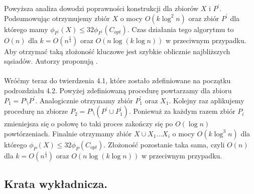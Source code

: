 \noindent
Powyższa analiza dowodzi poprawności konstrukcji dla zbiorów $X$ i $P^{'}$.
Podsumowując otrzymujemy zbiór $X$ o mocy $O(k \log^{2} n)$ oraz zbiór $P^{'}$ dla którego mamy $\phi_{P^{'}}(X) \leq 32\phi_{P^{'}}(C_{opt})$.
Czas działania tego algorytmu to $O(n)$ dla $k = O(n^{\frac{1}{4}})$ oraz $O(n \log (k \log n))$ w przeciwnym przypadku.
Aby otrzymać taką złożoność kluczowe jest szybkie oblicznie najbliższych sąsiadów.
Autorzy proponują \cite{10.1145/293347.293348}.
\\~\\
Wróćmy teraz do twierdzenia 4.1, które zostało zdefiniowane na początku podrozdziału 4.2.
Powyżej zdefiniowaną procedurę powtarzamy dla zbioru $P_{1} = P \setminus P^{'}$.
Analogicznie otrzymamy zbiór $P_{1}^{'}$ oraz $X_{1}$.
Kolejny raz aplikujemy procedurę na zbiorze $P_{2} = P \setminus (P^{'} \cup P_{1}^{'})$.
Ponieważ za każdym razem zbiór $P_{i}$ zmieniejsza się o połowę to taki proces zakończy się po $O(\log n)$ powtórzeniach.
Finalnie otrzymamy zbiór $X \cup X_{1} \dots X_{i}$ o mocy $O(k \log^{3} n)$ dla którego $\phi_{P}(X) \leq 32\phi_{P}(C_{opt})$.
Złożoność pozostanie taka sama, czyli $O(n)$ dla $k = O(n^{\frac{1}{4}})$ oraz $O(n \log (k \log n))$ w przeciwnym przypadku.

\subsection{Krata wykładnicza.}

